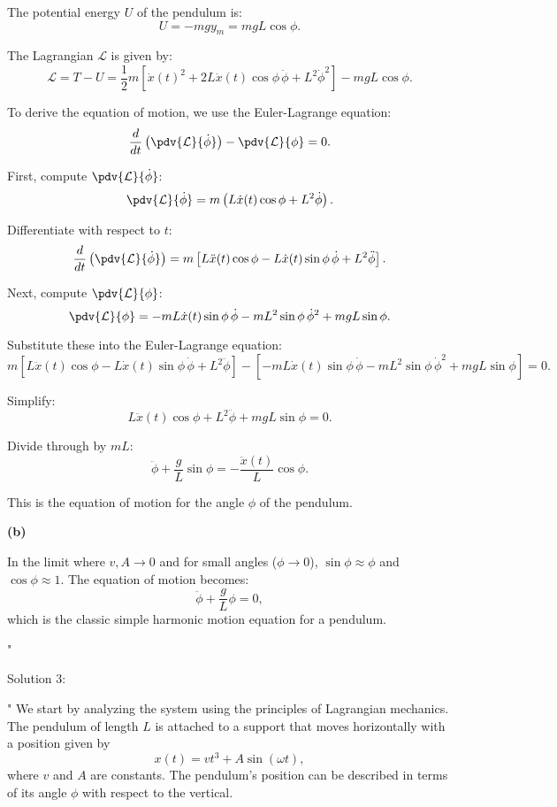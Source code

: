 The potential energy $U$ of the pendulum is:
\[
U = -mg y_m = mgL\cos\phi.
\]

The Lagrangian $\mathcal{L}$ is given by:
\[
\mathcal{L} = T - U = \frac{1}{2}m\left[\dot{x}(t)^2 + 2L\dot{x}(t)\cos\phi\,\dot{\phi} + L^2\dot{\phi}^2\right] - mgL\cos\phi.
\]

To derive the equation of motion, we use the Euler-Lagrange equation:
\[
\frac{d}{dt}\left(\pdv{\mathcal{L}}{\dot{\phi}}\right) - \pdv{\mathcal{L}}{\phi} = 0.
\]

First, compute $\pdv{\mathcal{L}}{\dot{\phi}}$:
\[
\pdv{\mathcal{L}}{\dot{\phi}} = m\left(L\dot{x}(t)\cos\phi + L^2\dot{\phi}\right).
\]

Differentiate with respect to $t$:
\[
\frac{d}{dt}\left(\pdv{\mathcal{L}}{\dot{\phi}}\right) = m\left[L\ddot{x}(t)\cos\phi - L\dot{x}(t)\sin\phi\,\dot{\phi} + L^2\ddot{\phi}\right].
\]

Next, compute $\pdv{\mathcal{L}}{\phi}$:
\[
\pdv{\mathcal{L}}{\phi} = -mL\dot{x}(t)\sin\phi\,\dot{\phi} - mL^2\sin\phi\,\dot{\phi}^2 + mgL\sin\phi.
\]

Substitute these into the Euler-Lagrange equation:
\[
m\left[L\ddot{x}(t)\cos\phi - L\dot{x}(t)\sin\phi\,\dot{\phi} + L^2\ddot{\phi}\right] - \left[-mL\dot{x}(t)\sin\phi\,\dot{\phi} - mL^2\sin\phi\,\dot{\phi}^2 + mgL\sin\phi\right] = 0.
\]

Simplify:
\[
L\ddot{x}(t)\cos\phi + L^2\ddot{\phi} + mgL\sin\phi = 0.
\]

Divide through by $mL$:
\[
\ddot{\phi} + \frac{g}{L}\sin\phi = -\frac{\ddot{x}(t)}{L}\cos\phi.
\]

This is the equation of motion for the angle $\phi$ of the pendulum.

\textbf{(b)}

In the limit where $v, A \to 0$ and for small angles ($\phi \to 0$), $\sin\phi \approx \phi$ and $\cos\phi \approx 1$. The equation of motion becomes:
\[
\ddot{\phi} + \frac{g}{L}\phi = 0,
\]
which is the classic simple harmonic motion equation for a pendulum.


"

Solution 3:

"
We start by analyzing the system using the principles of Lagrangian mechanics. The pendulum of length $L$ is attached to a support that moves horizontally with a position given by 
\[
x(t) = vt^3 + A\sin(\omega t),
\]
where $v$ and $A$ are constants. The pendulum's position can be described in terms of its angle $\phi$ with respect to the vertical.

